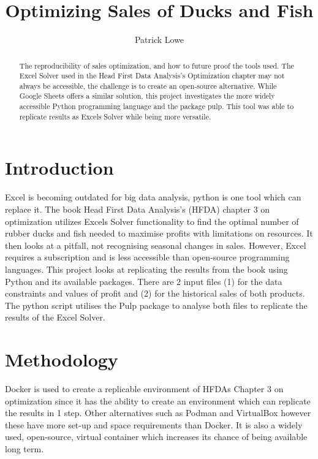 \documentclass[acmtog]{acmart}
\begin{document}
\title{Optimizing Sales of Ducks and Fish}
\author{Patrick Lowe}

\begin{abstract}
The reproducibility of sales optimization, and how to future proof the tools used. The Excel Solver used in the Head First Data Analysis's Optimization chapter may not always be accessible, the challenge is to create an open-source alternative. While Google Sheets offers a similar solution, this project investigates the more widely accessible Python programming language and the package pulp. This tool was able to replicate results as Excels Solver while being more versatile.
\end{abstract}

\maketitle

\section{Introduction}
Excel is becoming outdated for big data analysis, python is one tool which can replace it. The book Head First Data Analysis's (HFDA) chapter 3 on optimization utilizes Excels Solver functionality to find the optimal number of rubber ducks and fish needed to maximise profits with limitations on resources. It then looks at a pitfall, not recognising seasonal changes in sales. However, Excel requires a subscription and is less accessible than open-source programming languages. This project looks at replicating the results from the book using Python and its available packages. There are 2 input files (1) for the data constraints and values of profit and (2) for the historical sales of both products. The python script utilises the Pulp package to analyse both files to replicate the results of the Excel Solver. 

\section{Methodology}
Docker is used to create a replicable environment of HFDAs Chapter 3 on optimization since it has the ability to create an environment which can replicate the results in 1 step. Other alternatives such as Podman and VirtualBox however these have more set-up and space requirements than Docker. It is also a widely used, open-source, virtual container which increases its chance of being available long term. 
\end{document}
